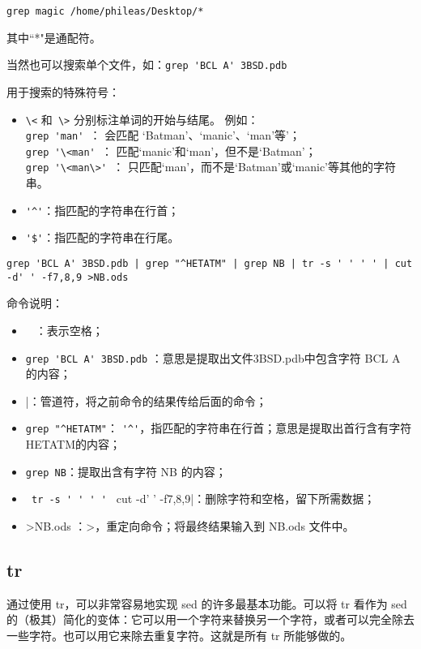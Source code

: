 \verb|grep magic /home/phileas/Desktop/*|

其中``*"是通配符。

当然也可以搜索单个文件，如：\verb*[grep 'BCL A' 3BSD.pdb[

用于搜索的特殊符号：
\begin{itemize}
\item \verb|\<| 和\verb| \>| 分别标注单词的开始与结尾。 例如：\\ 
\verb|grep 'man' |： 会匹配 ‘Batman’、‘manic’、‘man’等'；\\
\verb|grep '\<man' |： 匹配‘manic’和‘man’，但不是‘Batman’；\\ 
\verb|grep '\<man\>' |： 只匹配‘man’，而不是‘Batman’或‘manic’等其他的字符串。 

\item \verb|'^'|：指匹配的字符串在行首；

\item \verb|'$'|：指匹配的字符串在行尾。
\end{itemize}


 \verb*[grep 'BCL A' 3BSD.pdb | grep "^HETATM" | grep NB | tr -s ' ' ' ' | cut -d' ' -f7,8,9 >NB.ods[ 

命令说明：
\begin{itemize}
\item \verb*| | ：表示空格；
\item \verb*[grep 'BCL A' 3BSD.pdb[ ：意思是提取出文件3BSD.pdb中包含字符 BCL A 的内容；
\item |：管道符，将之前命令的结果传给后面的命令；
\item \verb*[grep "^HETATM"[： \verb|'^'|，指匹配的字符串在行首；意思是提取出首行含有字符HETATM的内容；
\item \verb*|grep NB|：提取出含有字符 NB 的内容；
\item \verb*| tr -s ' ' ' ' | cut -d' ' -f7,8,9|：删除字符和空格，留下所需数据；
\item >NB.ods ：>，重定向命令；将最终结果输入到 NB.ods 文件中。
\end{itemize}




\subsection{tr}
通过使用 tr，可以非常容易地实现 sed 的许多最基本功能。可以将 tr 看作为 sed 的（极其）简化的变体：它可以用一个字符来替换另一个字符，或者可以完全除去一些字符。也可以用它来除去重复字符。这就是所有 tr 所能够做的。 


